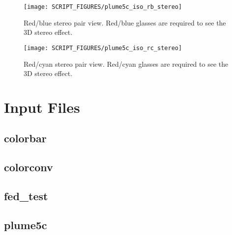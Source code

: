 \documentclass[11pt,twoside]{book}
\begin{document}
\begin{figure}[bph]
\begin{center}
\texttt{[image: SCRIPT\_FIGURES/plume5c\_iso\_rb\_stereo]}
\caption[Red/blue stereo pair view.]{
Red/blue stereo pair view. Red/blue
glasses are required to see the 3D stereo effect. }
\label{figrbstereo}
\end{center}
\end{figure}

\begin{figure}[bph]
\begin{center}
\texttt{[image: SCRIPT\_FIGURES/plume5c\_iso\_rc\_stereo]}
\caption[Red/cyan stereo pair view.]{
Red/cyan stereo pair view. Red/cyan
glasses are required to see the 3D stereo effect. }
\label{figrcstereo}
\end{center}
\end{figure}



\appendix
{}

\chapter{Input Files}
\label{fdsinputfiles}

\section{colorbar}
\label{FDScolorbar}

\section{colorconv}
\label{FDScolorconv}

\section{fed\_test}

\section{plume5c}
\label{FDSplume5c}
\end{document}
